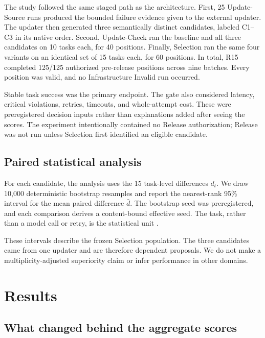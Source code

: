 \documentclass[10pt,twocolumn]{article}
\begin{document}
The study followed the same staged path as the architecture. First, 25
Update-Source runs produced the bounded failure evidence given to the external
updater. The updater then generated three semantically distinct candidates,
labeled C1--C3 in its native order. Second, Update-Check ran the baseline and
all three candidates on 10 tasks each, for 40 positions. Finally, Selection ran
the same four variants on an identical set of 15 tasks each, for 60 positions.
In total, R15 completed 125/125 authorized pre-release positions across nine
batches. Every position was valid, and no Infrastructure Invalid run occurred.

Stable task success was the primary endpoint. The gate also considered
latency, critical violations, retries, timeouts, and whole-attempt cost. These
were preregistered decision inputs rather than explanations added after seeing
the scores. The experiment intentionally contained no Release authorization;
Release was not run unless Selection first identified an eligible candidate.

\subsection{Paired statistical analysis}

For each candidate, the analysis uses the 15 task-level differences
$d_t$. We draw 10,000 deterministic bootstrap resamples and report the
nearest-rank 95\% interval for the mean paired difference $\bar d$. The
bootstrap seed was preregistered, and each comparison derives a
content-bound effective seed. The task, rather than a model call or retry, is
the statistical unit \cite{efron1979bootstrap}.

These intervals describe the frozen Selection population. The three
candidates came from one updater and are therefore dependent proposals. We do
not make a multiplicity-adjusted superiority claim or infer performance in
other domains.

\section{Results}

\subsection{What changed behind the aggregate scores}
\end{document}
